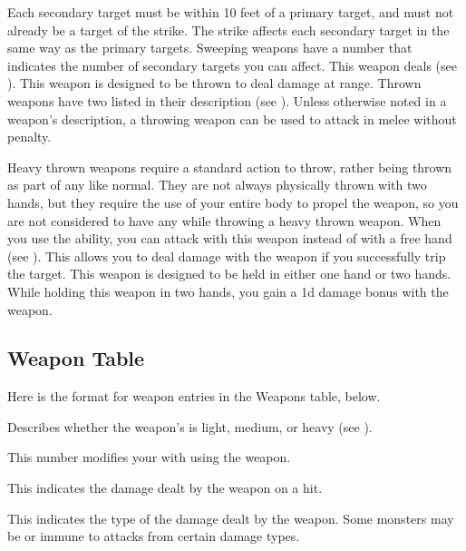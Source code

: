         Each secondary target must be within 10 feet of a primary target, and must not already be a target of the strike.
        The strike affects each secondary target in the same way as the primary targets.
        Sweeping weapons have a number that indicates the number of secondary targets you can affect.
         This weapon deals  (see ).
         This weapon is designed to be thrown to deal damage at range.
        Thrown weapons have two  listed in their description (see ).
        Unless otherwise noted in a weapon's description, a throwing weapon can be used to attack in melee without penalty.

        Heavy thrown weapons require a standard action to throw, rather being thrown as part of any  like normal.
        They are not always physically thrown with two hands, but they require the use of your entire body to propel the weapon, so you are not considered to have any  while throwing a heavy thrown weapon.
         When you use the  ability, you can attack with this weapon instead of with a free hand (see ).
        This allows you to deal damage with the weapon if you successfully trip the target.
         This weapon is designed to be held in either one hand or two hands.
        While holding this weapon in two hands, you gain a \plus1d damage bonus with the weapon.

    \subsection{Weapon Table}
        Here is the format for weapon entries in the Weapons table, below.

         Describes whether the weapon's  is light, medium, or heavy (see ).

         This number modifies your  with  using the weapon.

         This  indicates the damage dealt by the weapon on a hit.

         This indicates the type of the damage dealt by the weapon.
        Some monsters may be  or immune to attacks from certain damage types.

